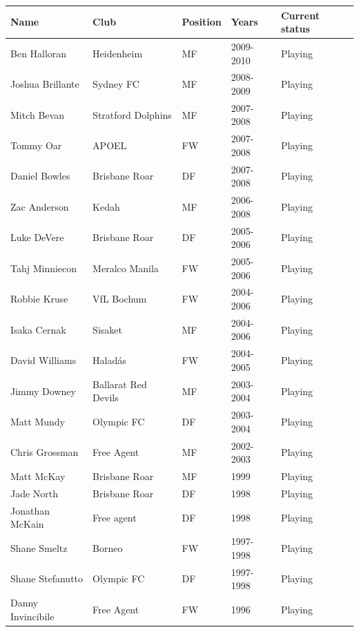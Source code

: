 \documentclass{article}
\begin{document}
\begin{tabular}{lllll}
\toprule
Name & Club & Position & Years & Current status \\
\midrule
Ben Halloran & Heidenheim & MF & 2009-2010 & Playing \\
Joshua Brillante & Sydney FC & MF & 2008-2009 & Playing \\
Mitch Bevan & Stratford Dolphins & MF & 2007-2008 & Playing \\
Tommy Oar & APOEL & FW & 2007-2008 & Playing \\
Daniel Bowles & Brisbane Roar & DF & 2007-2008 & Playing \\
Zac Anderson & Kedah & MF & 2006-2008 & Playing \\
Luke DeVere & Brisbane Roar & DF & 2005-2006 & Playing \\
Tahj Minniecon & Meralco Manila & FW & 2005-2006 & Playing \\
Robbie Kruse & VfL Bochum & FW & 2004-2006 & Playing \\
Isaka Cernak & Sisaket & MF & 2004-2006 & Playing \\
David Williams & Haladás & FW & 2004-2005 & Playing \\
Jimmy Downey & Ballarat Red Devils & MF & 2003-2004 & Playing \\
Matt Mundy & Olympic FC & DF & 2003-2004 & Playing \\
Chris Grossman & Free Agent & MF & 2002-2003 & Playing \\
Matt McKay & Brisbane Roar & MF & 1999 & Playing \\
Jade North & Brisbane Roar & DF & 1998 & Playing \\
Jonathan McKain & Free agent & DF & 1998 & Playing \\
Shane Smeltz & Borneo & FW & 1997-1998 & Playing \\
Shane Stefanutto & Olympic FC & DF & 1997-1998 & Playing \\
Danny Invincibile & Free Agent & FW & 1996 & Playing \\
\bottomrule
\end{tabular}
\end{document}
